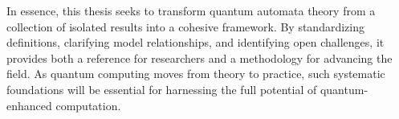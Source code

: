 In essence, this thesis seeks to transform quantum automata theory from a collection of isolated results into a cohesive framework. By standardizing definitions, clarifying model relationships, and identifying open challenges, it provides both a reference for researchers and a methodology for advancing the field. As quantum computing moves from theory to practice, such systematic foundations will be essential for harnessing the full potential of quantum-enhanced computation.  